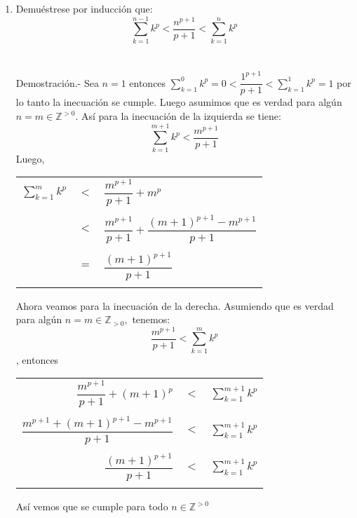 \begin{enumerate}
\begin{enumerate}[\bfseries (a)]
\item Demuéstrese por inducción que:
$$\displaystyle\sum_{k=1}^{n-1} k^p < \dfrac{n^{p+1}}{p+1} < \sum_{k=1}^n k^p$$\\\\
Demostración.- \; Sea $n=1$ entonces $\sum\limits_{k=1}^{0} k^p = 0 < \dfrac{1^{p+1}}{p+1}< \sum\limits_{k=1}^1 k^p =1$ por lo tanto la inecuación se cumple. Luego asumimos que es verdad para algún $n=m \in \mathbb{Z}^{>0}$. Así para la inecuación de la izquierda se tiene:
$$\sum\limits_{k=1}^{m+1} k^p < \dfrac{m^{p+1}}{p+1}$$ Luego,
\begin{center}
\begin{tabular}{rcl}
$\sum\limits_{k=1}^m k^p$&$<$&$\dfrac{m^{p+1}}{p+1} + m^p$\\\\
&$<$&$\dfrac{m^{p+1}}{p+1} + \dfrac{(m+1)^{p+1} - m^{p+1}}{p+1}$\\\\
&$=$&$\dfrac{(m+1)^{p+1}}{p+1}$\\\\
\end{tabular}
\end{center}
Ahora veamos para la inecuación de la derecha. Asumiendo que es verdad para algún $n= m \in \mathbb{Z}_{>0},$ tenemos:
$$\dfrac{m^{p+1}}{p+1} < \sum\limits_{k=1}^m k^p$$, entonces
\begin{center}
\begin{tabular}{rcl}
$\dfrac{m^{p+1}}{p+1} + (m+1)^p$&$<$&$\sum\limits_{k=1}^{m+1} k^p$\\\\
$\dfrac{m^{p+1} + (m+1)^{p+1} - m^{p+1}}{p+1}$&$<$&$\sum\limits_{k=1}^{m+1} k^p$\\\\
$\dfrac{(m+1)^{p+1}}{p+1}$&$<$&$\sum\limits_{k=1}^{m+1} k^p$\\\\
\end{tabular}
\end{center}
Así vemos que se cumple para todo $n \in \mathbb{Z}^{>0}$\\\\
\end{enumerate}


\end{enumerate}
